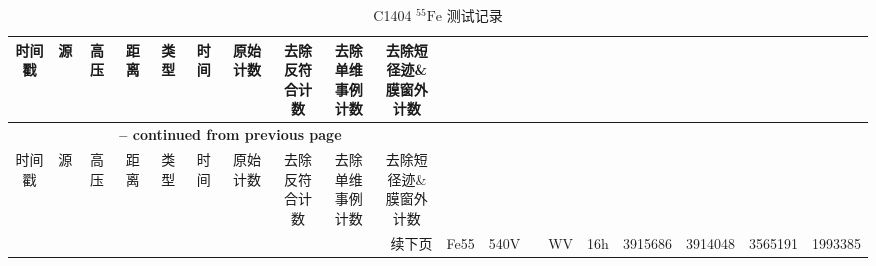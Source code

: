 \begin{center}
{ \tabcolsep=3pt
\begin{longtable}{c c c c c c c c c c}
    \caption{C1404 $\mathrm{^{55}Fe}$ 测试记录}
    \label{tab:oct_C1404_Fe55} \\
    \toprule
    时间戳  &   源  &   高压    &   距离    &   类型    &   时间    &   原始计数    &   \makecell[c]{去除反符\\合计数}  &   \makecell[c]{去除单维\\事例计数}    &   \makecell[c]{去除短径迹\& \\ 膜窗外计数}  \\
    \midrule
    \endfirsthead

    \multicolumn{10}{c}{{\bfseries \tablename\ \thetable{} -- continued from previous page}} \\
    \toprule
    时间戳  &   源  &   高压    &   距离    &   类型    &   时间    &   原始计数    &   \makecell[c]{去除反符\\合计数}  &   \makecell[c]{去除单维\\事例计数}    &   \makecell[c]{去除短径迹\& \\ 膜窗外计数}  \\
    \midrule
    \endhead

    \bottomrule
    \multicolumn{10}{r}{续下页}
    \endfoot

    \bottomrule
    \endlastfoot
    20241103154350 & Fe55 & 540V &  & WV & 16h & 3915686 & 3914048 & 3565191 & 1993385 \\ 

\end{longtable}
}
\end{center}
